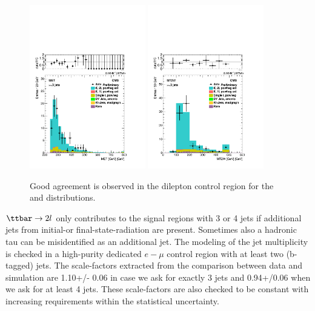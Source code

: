 \begin{figure}[ht]
\centering
\includegraphics[width=0.45\textwidth]{plots_stop/data_MC_plot__byProductionMode__met__ge3j_ge250met__linScale.pdf}
\includegraphics[width=0.45\textwidth]{plots_stop/data_MC_plot__byProductionMode__mt2w__ge3j_ge250met__linScale.pdf}
\caption{\label{fig:dilepton} Good agreement is observed in the dilepton control region for the \MET and \MTtW distributions.}
\end{figure}

$\ttbar\rightarrow 2l$ only contributes to the signal regions with 3 or 4 jets if additional jets from initial-or final-state-radiation are present.  Sometimes also a hadronic tau can be misidentified as an additional jet.  The modeling of the jet multiplicity is checked in a high-purity dedicated $e-\mu$ control region with at least two (b-tagged) jets.  The scale-factors extracted from the comparison between data and simulation are 1.10+/- 0.06 in case we ask for exactly 3 jets and 0.94+/0.06 when we ask for at least 4 jets.  These scale-factors are also checked to be constant with increasing \MET requirements within the statistical uncertainty.


